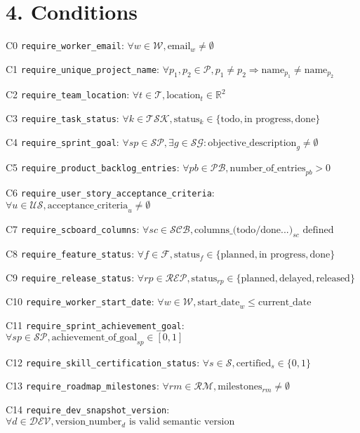 \documentclass[12pt]{article}
\begin{document}
\section{4. Conditions}
\item[C0] \texttt{require\_worker\_email}: $\forall w \in \mathcal{W}, \text{email}_w \neq \emptyset$
    \item[C1] \texttt{require\_unique\_project\_name}: $\forall p_1, p_2 \in \mathcal{P}, p_1 \neq p_2 \Rightarrow \text{name}_{p_1} \neq \text{name}_{p_2}$
    \item[C2] \texttt{require\_team\_location}: $\forall t \in \mathcal{T}, \text{location}_t \in \mathbb{R}^2$
    \item[C3] \texttt{require\_task\_status}: $\forall k \in \mathcal{TSK}, \text{status}_k \in \{\text{todo}, \text{in progress}, \text{done}\}$
    \item[C4] \texttt{require\_sprint\_goal}: $\forall sp \in \mathcal{SP}, \exists g \in \mathcal{SG} : \text{objective\_description}_g \neq \emptyset$
    \item[C5] \texttt{require\_product\_backlog\_entries}: $\forall pb \in \mathcal{PB}, \text{number\_of\_entries}_{pb} > 0$
    \item[C6] \texttt{require\_user\_story\_acceptance\_criteria}: $\forall u \in \mathcal{US}, \text{acceptance\_criteria}_u \neq \emptyset$
    \item[C7] \texttt{require\_scboard\_columns}: $\forall sc \in \mathcal{SCB}, \text{columns\_(todo/done...)}_{sc} \text{ defined}$
    \item[C8] \texttt{require\_feature\_status}: $\forall f \in \mathcal{F}, \text{status}_f \in \{\text{planned}, \text{in progress}, \text{done}\}$
    \item[C9] \texttt{require\_release\_status}: $\forall rp \in \mathcal{REP}, \text{status}_{rp} \in \{\text{planned}, \text{delayed}, \text{released}\}$
    \item[C10] \texttt{require\_worker\_start\_date}: $\forall w \in \mathcal{W}, \text{start\_date}_w \leq \text{current\_date}$
    \item[C11] \texttt{require\_sprint\_achievement\_goal}: $\forall sp \in \mathcal{SP}, \text{achievement\_of\_goal}_{sp} \in [0,1]$
    \item[C12] \texttt{require\_skill\_certification\_status}: $\forall s \in \mathcal{S}, \text{certified}_s \in \{0,1\}$
    \item[C13] \texttt{require\_roadmap\_milestones}: $\forall rm \in \mathcal{RM}, \text{milestones}_{rm} \neq \emptyset$
    \item[C14] \texttt{require\_dev\_snapshot\_version}: $\forall d \in \mathcal{DEV}, \text{version\_number}_d \text{ is valid semantic version}$
\end{document}
